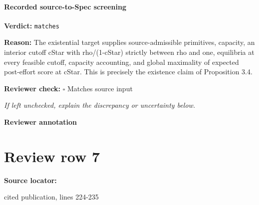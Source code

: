 \documentclass[10pt]{article}
\newcommand{\reviewerbox}{%
  \par\noindent\fbox{\parbox{0.96\linewidth}{\rule{0pt}{0.38in}}}\par
}
\newcommand{\reviewmatch}[1]{%
  \par\noindent\textbf{Reviewer check:} $\square$\; #1\par
  \noindent\emph{If left unchecked, explain the discrepancy or uncertainty below.}\par
}
\begin{document}
\paragraph{Recorded source-to-Spec screening}
\textbf{Verdict:} \texttt{matches}
\\
{\raggedright
\textbf{Reason:} The existential target supplies source-\allowbreak{}admissible primitives, capacity, an interior cutoff cStar with rho/\allowbreak{}(1-\allowbreak{}cStar) strictly between rho and one, equilibria at every feasible cutoff, capacity accounting, and global maximality of expected post-\allowbreak{}effort score at cStar.\allowbreak{} This is precisely the existence claim of Proposition 3.\allowbreak{}4.\allowbreak{}
\par}
\reviewmatch{Matches source input}
\noindent\textbf{Reviewer annotation}\par
\reviewerbox
\clearpage
\hypertarget{source-claim-d14371f504c1d7ee}{}
\section*{Review row 7}
\textbf{Source locator:} {\footnotesize\raggedright cited publication, lines 224-\allowbreak{}235\par}
\end{document}
